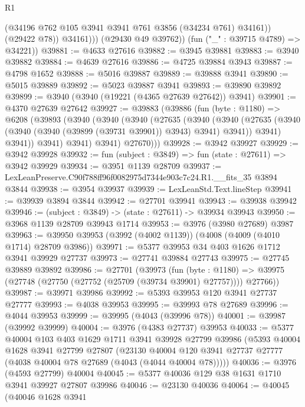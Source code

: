 \begin{lexlean}{R1}
\begin{coremodule}
                  (@34196 @762 @105 @3941 @3941 @761 @3856 (@34234 @761) @34161))
                (@29422 @78))
              @34161)))
        (@29430 @49 @39762))
      (fun ("_" : @39715 @4789) => @34221))
@39881 := @4633 @27616
@39882 := @3945 @39881
@39883 := @3940 @39882
@39884 := @4639 @27616
@39886 := @4725 @39884 @3943
@39887 := @4798 @1652
@39888 := @5016 @39887
@39889 := @39888 @3941
@39890 := @5015 @39889
@39892 := @5023 @39887 @3941
@39893 := @39890 @39892
@39899 := @3940 (@3940 (@19221 (@4365 @27639 @27642)) @3941)
@39901 := @4370 @27639 @27642
@39927 := @39883
    (@39886
      (fun (byte : @1180) =>
      @6208
        (@39893
          (@3940
            (@3940
              (@3940
                (@27635
                  (@3940
                    (@3940
                      (@27635 (@3940 (@3940 (@3940 (@39899 (@39731 @39901)) @3943) @3941) @3941))
                      @3941)
                    @3941))
                @3941)
              @3941)
            @3941)
          @27670)))
@39928 := @3942 @39927
@39929 := @3942 @39928
@39932 := fun (subject : @3849) => fun (state : @27611) => @3942 @39929
@39934 := @3951 @1139 @28709
@39937 := LexLeanPreserve.C90f788ff96f0082975d7344e903c7c24.R1.__fits_35 @3894 @3844
@39938 := @3954 @39937
@39939 := LexLeanStd.Text.lineStep
@39941 := @39939 @3894 @3844
@39942 := @27701 @39941
@39943 := @39938 @39942
@39946 := (subject : @3849) -> (state : @27611) -> @39934 @39943
@39950 := @3968 @1139 @28709 @39943 @1714
@39953 := @3976 (@3980 @27689) @3987
@39963 := @39950 @39953 (@3992 (@4002 @1139)) (@4008 (@4009 (@4010 @1714) @28709 @3986))
@39971 := @5377 @39953 @34 @403 @1626 @1712 @3941 @39929 @27737
@39973 := @27741 @39884 @27743
@39975 := @27745 @39889 @39892
@39986 := @27701
    (@39973
      (fun (byte : @1180) =>
      @39975 (@27748 (@27750 (@27752 (@25709 (@39734 @39901) @27757)))) @27766))
@39987 := @39971 @39986
@39992 := @5393 @39953 @120 @3941 @27737 @27777
@39993 := @4038 @39953
@39995 := @39993 @78 @27689
@39996 := @4044 @39953
@39999 := @39995 (@4043 (@39996 @78))
@40001 := @39987 (@39992 @39999)
@40004 := @3976 (@4383 @27737) @39953
@40033 := @5377
    @40004
    @103
    @403
    @1629
    @1711
    @3941
    @39928
    @27799
    @39986
    (@5393
      @40004
      @1628
      @3941
      @27799
      @27807
      (@23130 @40004 @120 @3941 @27737 @27777 (@4038 @40004 @78 @27689 (@4043 (@4044 @40004 @78)))))
@40036 := @3976 (@4593 @27799) @40004
@40045 := @5377 @40036 @129 @38 @1631 @1710 @3941 @39927 @27807 @39986
@40046 := @23130 @40036
@40064 := @40045
    (@40046
      @1628
      @3941

\end{coremodule}
\end{lexlean}

